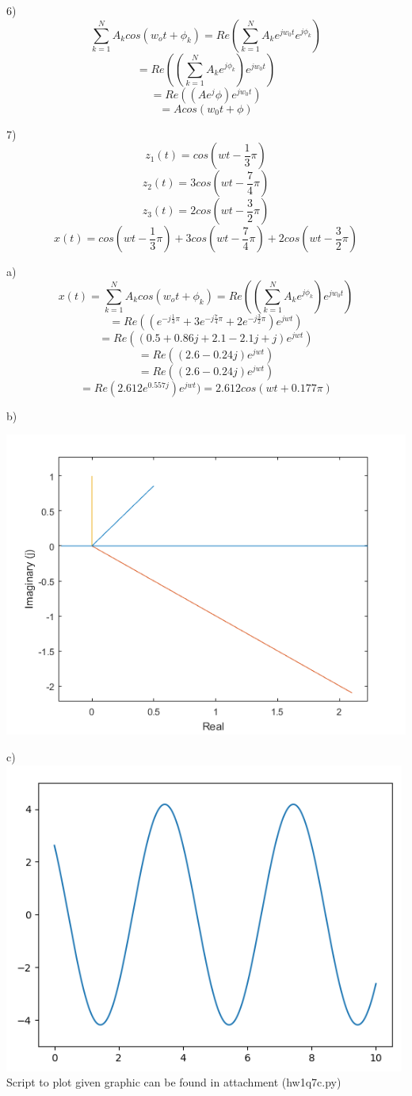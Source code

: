 \documentclass{article}
\begin{document}
	6)
	$$\sum_{k=1}^{N}A_k cos(w_o t+ \phi_k)=Re(\sum_{k=1}^{N}A_ke^{jw_0t}e^{j\phi_k})$$
	$$=Re((\sum_{k=1}^{N}A_ke^{j\phi_k})e^{jw_0t})$$
	$$=Re((Ae^j\phi)e^{jw_0t})$$
	$$=Acos(w_0t+\phi)$$
	
	\par
	
	7)
	$$z_1(t)=cos(wt-\frac{1}{3}\pi)$$
	$$z_2(t)=3cos(wt-\frac{7}{4}\pi)$$
	$$z_3(t)=2cos(wt-\frac{3}{2}\pi)$$
	$$x(t)=cos(wt-\frac{1}{3}\pi)+3cos(wt-\frac{7}{4}\pi)+2cos(wt-\frac{3}{2}\pi)$$
	\par
	a)
	$$x(t)=\sum_{k=1}^{N}A_k cos(w_o t+ \phi_k)=Re((\sum_{k=1}^{N}A_ke^{j\phi_k})e^{jw_0t})$$
	$$=Re((e^{-j\frac{1}{3}\pi} + 3e^{-j\frac{7}{4}\pi} + 2e^{-j\frac{3}{2}\pi})e^{jwt})$$
	$$=Re((0.5+0.86j+2.1-2.1j+j)e^{jwt})$$
	$$=Re((2.6-0.24j)e^{jwt})$$
	$$=Re((2.6-0.24j)e^{jwt})$$
	$$=Re(2.612e^{0.557j})e^{jwt})=2.612cos(wt+0.177\pi)$$
	\par
	b)\par
	\includegraphics[scale=0.5]{q7b}
	\par
	c)\includegraphics[scale=0.9]{q7c}
	Script to plot given graphic can be found in attachment (hw1q7c.py)
	\par
	
\end{document}
